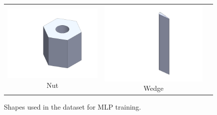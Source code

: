 \begin{figure}[htbp]
\begin{minipage}{0.5\textwidth}
\begin{tabular}{ccc}
      \begin{minipage}{0.3\linewidth}
        \centering
        \includegraphics[width=\linewidth]{figures/parts/nut.PNG}
        \scriptsize Nut
      \end{minipage} &
      \begin{minipage}{0.3\linewidth}
        \centering
        \includegraphics[width=\linewidth]{figures/parts/wedge.PNG}
        \scriptsize Wedge
      \end{minipage} &
      \begin{minipage}{0.3\linewidth} \end{minipage} \\
    \end{tabular}
  \end{minipage}

  \caption{Shapes used in the dataset for MLP training.}\label{fig:part_shapes_grid}
\end{figure}














